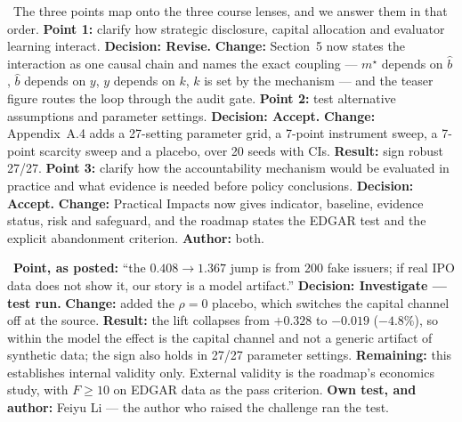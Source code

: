 \begin{description}[leftmargin=0pt,labelsep=4pt,style=unboxed,itemsep=4pt]
\item[\textbf{Zhengjun He (Team FP4, with Yichen Shen) --- written challenge in the class thread, 15 October 2026}]\ The three points map onto the three course lenses, and we answer them in that order. \textbf{Point 1:} clarify how strategic disclosure, capital allocation and evaluator learning interact. \textbf{Decision: Revise.} \textbf{Change:} Section~5 now states the interaction as one causal chain and names the exact coupling --- $m^\star$ depends on $\hat b$, $\hat b$ depends on $y$, $y$ depends on $k$, $k$ is set by the mechanism --- and the teaser figure routes the loop through the audit gate. \textbf{Point 2:} test alternative assumptions and parameter settings. \textbf{Decision: Accept.} \textbf{Change:} Appendix~A.4 adds a 27-setting parameter grid, a 7-point instrument sweep, a 7-point scarcity sweep and a placebo, over 20 seeds with CIs. \textbf{Result:} sign robust 27/27. \textbf{Point 3:} clarify how the accountability mechanism would be evaluated in practice and what evidence is needed before policy conclusions. \textbf{Decision: Accept.} \textbf{Change:} Practical Impacts now gives indicator, baseline, evidence status, risk and safeguard, and the roadmap states the EDGAR test and the explicit abandonment criterion. \textbf{Author:} both.
\item[\textbf{Feiyu Li --- individual self-challenge, posted to the class thread 14 October 2026}]\ \textbf{Point, as posted:} ``the $0.408\to1.367$ jump is from 200 fake issuers; if real IPO data does not show it, our story is a model artifact.'' \textbf{Decision: Investigate --- test run.} \textbf{Change:} added the $\rho=0$ placebo, which switches the capital channel off at the source. \textbf{Result:} the lift collapses from $+0.328$ to $-0.019$ ($-4.8\%$), so within the model the effect is the capital channel and not a generic artifact of synthetic data; the sign also holds in 27/27 parameter settings. \textbf{Remaining:} this establishes internal validity only. External validity is the roadmap's economics study, with $F\ge10$ on EDGAR data as the pass criterion. \textbf{Own test, and author:} Feiyu Li --- the author who raised the challenge ran the test.

\end{description}
